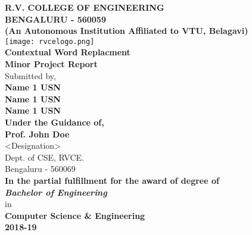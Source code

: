 \documentclass[12pt]{report}
\begin{document}
 


\title{}
\author{}
\begin{center}
	\textbf {
		\Huge R.V. COLLEGE OF ENGINEERING \\ 
		\Large BENGALURU - 560059\\ 
		\large(An Autonomous Institution Affiliated to VTU, Belagavi)\\[1cm]
	}
	\texttt{[image: rvcelogo.png]}\\[1cm]
		\LARGE \textbf{Contextual Word Replacment}\\[1cm]
		\large \textbf{Minor Project Report} \\
		\normalsize Submitted by,\\[0.5cm]
										
		\large \textbf{Name 1		USN}\\
		\large \textbf{Name 1		USN}\\
		\large \textbf{Name 1		USN}\\[1cm]
										
		\normalsize \textbf{Under the Guidance of,}\\[0.5cm]
		\large \textbf{ Prof. John Doe}\\
		\normalsize <Designation>\\
		\normalsize Dept. of CSE, RVCE.\\ Bengaluru - 560069 \\[0,5cm]
										
		\large \textbf {In the partial fulfillment for the award of degree of}\\
		\Large \textbf {\textit{Bachelor of Engineering}}\\ in \\
		\large \textbf {Computer Science \& Engineering \\ 2018-19} 
										
	\end{center}
				
\end{document}
